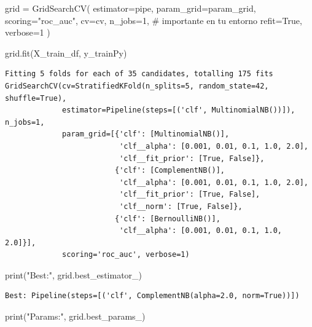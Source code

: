 \documentclass[
  letterpaper,
  DIV=11,
  numbers=noendperiod]{scrartcl}
\newenvironment{Shaded}{\begin{snugshade}}{\end{snugshade}}
\newcommand{\BuiltInTok}[1]{\textcolor[rgb]{0.00,0.23,0.31}{#1}}
\newcommand{\CommentTok}[1]{\textcolor[rgb]{0.37,0.37,0.37}{#1}}
\newcommand{\DecValTok}[1]{\textcolor[rgb]{0.68,0.00,0.00}{#1}}
\newcommand{\NormalTok}[1]{\textcolor[rgb]{0.00,0.23,0.31}{#1}}
\newcommand{\OperatorTok}[1]{\textcolor[rgb]{0.37,0.37,0.37}{#1}}
\newcommand{\StringTok}[1]{\textcolor[rgb]{0.13,0.47,0.30}{#1}}
\newcommand{\VariableTok}[1]{\textcolor[rgb]{0.07,0.07,0.07}{#1}}
\begin{document}
\begin{Shaded}
\begin{Highlighting}[]
\NormalTok{grid }\OperatorTok{=}\NormalTok{ GridSearchCV(}
\NormalTok{    estimator}\OperatorTok{=}\NormalTok{pipe,}
\NormalTok{    param\_grid}\OperatorTok{=}\NormalTok{param\_grid,}
\NormalTok{    scoring}\OperatorTok{=}\StringTok{"roc\_auc"}\NormalTok{,}
\NormalTok{    cv}\OperatorTok{=}\NormalTok{cv,}
\NormalTok{    n\_jobs}\OperatorTok{=}\DecValTok{1}\NormalTok{,     }\CommentTok{\# importante en tu entorno}
\NormalTok{    refit}\OperatorTok{=}\VariableTok{True}\NormalTok{,}
\NormalTok{    verbose}\OperatorTok{=}\DecValTok{1}
\NormalTok{)}

\NormalTok{grid.fit(X\_train\_df, y\_trainPy)}
\end{Highlighting}
\end{Shaded}

\begin{verbatim}
Fitting 5 folds for each of 35 candidates, totalling 175 fits
GridSearchCV(cv=StratifiedKFold(n_splits=5, random_state=42, shuffle=True),
             estimator=Pipeline(steps=[('clf', MultinomialNB())]), n_jobs=1,
             param_grid=[{'clf': [MultinomialNB()],
                          'clf__alpha': [0.001, 0.01, 0.1, 1.0, 2.0],
                          'clf__fit_prior': [True, False]},
                         {'clf': [ComplementNB()],
                          'clf__alpha': [0.001, 0.01, 0.1, 1.0, 2.0],
                          'clf__fit_prior': [True, False],
                          'clf__norm': [True, False]},
                         {'clf': [BernoulliNB()],
                          'clf__alpha': [0.001, 0.01, 0.1, 1.0, 2.0]}],
             scoring='roc_auc', verbose=1)
\end{verbatim}

\begin{Shaded}
\begin{Highlighting}[]
\BuiltInTok{print}\NormalTok{(}\StringTok{"Best:"}\NormalTok{, grid.best\_estimator\_)}
\end{Highlighting}
\end{Shaded}

\begin{verbatim}
Best: Pipeline(steps=[('clf', ComplementNB(alpha=2.0, norm=True))])
\end{verbatim}

\begin{Shaded}
\begin{Highlighting}[]
\BuiltInTok{print}\NormalTok{(}\StringTok{"Params:"}\NormalTok{, grid.best\_params\_)}
\end{Highlighting}
\end{Shaded}
\end{document}
